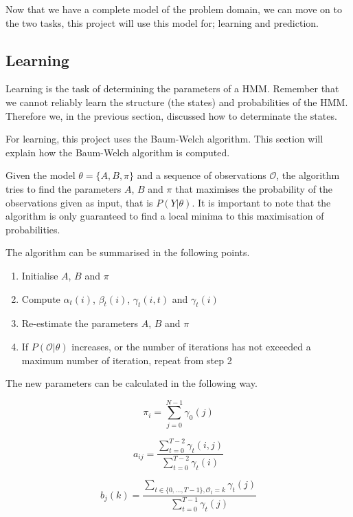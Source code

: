 Now that we have a complete model of the problem domain, we can move on to the two tasks, this project will use this model for; learning and prediction.

\subsection{Learning}\label{sec:learner}
Learning is the task of determining the parameters of a HMM. Remember that we cannot reliably learn the structure (the states) and probabilities of the HMM. Therefore we, in the previous section, discussed how to determinate the states.

For learning, this project uses the Baum-Welch algorithm\cite{hmmIntroduction}. This section will explain how the Baum-Welch algorithm is computed.

Given the model $\theta = \{A, B, \pi\}$ and a sequence of observations $\mathcal{O}$, the algorithm tries to find the parameters $A$, $B$ and $\pi$ that maximises the probability of the observations given as input, that is $P(Y | \theta)$. It is important to note that the algorithm is only guaranteed to find a local minima to this maximisation of probabilities.

The algorithm can be summarised in the following points\cite{hmmIntroduction}.

\begin{enumerate}
\item Initialise $A$, $B$ and $\pi$
\item Compute $\alpha_t(i)$, $\beta_t(i)$, $\gamma_t(i,t)$ and $\gamma_t(i)$
\item Re-estimate the parameters $A$, $B$ and $\pi$
\item If $P(\mathcal{O} | \theta)$ increases, or the number of iterations has not exceeded a maximum number of iteration, repeat from step 2
\end{enumerate}

The new parameters can be calculated in the following way\cite{hmmIntroduction}.

\begin{equation*}
\pi_i = \sum\limits_{j=0}^{N-1} \gamma_0(j)
\end{equation*}

\begin{equation*}
a_{ij} = \frac{\sum\limits_{t=0}^{T-2} \gamma_t(i, j)}{ \sum\limits_{t=0}^{T-2} \gamma_t(i) }
\end{equation*}

\begin{equation*}
b_j(k) = \frac{ \sum\limits_{t \in \{0,\ldots, T-1\}, \mathcal{O}_t = k} \gamma_t(j) } { \sum\limits_{t=0}^{T-1} \gamma_t(j) }
\end{equation*}

